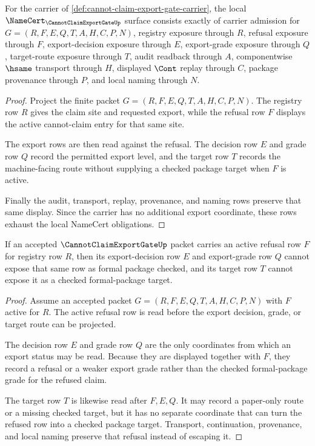 \begin{theorem}
\label{thm:cannot-claim-export-gate-obligations}
For the carrier of \autoref{def:cannot-claim-export-gate-carrier}, the local $\NameCert_{\CannotClaimExportGateUp}$ surface consists exactly of carrier admission for $G=(R,F,E,Q,T,A,H,C,P,N)$, registry exposure through $R$, refusal exposure through $F$, export-decision exposure through $E$, export-grade exposure through $Q$, target-route exposure through $T$, audit readback through $A$, componentwise $\hsame$ transport through $H$, displayed $\Cont$ replay through $C$, package provenance through $P$, and local naming through $N$.
\end{theorem}
\begin{proof}
Project the finite packet $G=(R,F,E,Q,T,A,H,C,P,N)$. The registry row $R$ gives the claim site and requested export, while the refusal row $F$ displays the active cannot-claim entry for that same site.

The export rows are then read against the refusal. The decision row $E$ and grade row $Q$ record the permitted export level, and the target row $T$ records the machine-facing route without supplying a checked package target when $F$ is active.

Finally the audit, transport, replay, provenance, and naming rows preserve that same display. Since the carrier has no additional export coordinate, these rows exhaust the local NameCert obligations.
\end{proof}

\begin{theorem}
\label{thm:cannot-claim-export-gate-refusal-nonescape}
If an accepted $\CannotClaimExportGateUp$ packet carries an active refusal row $F$ for registry row $R$, then its export-decision row $E$ and export-grade row $Q$ cannot expose that same row as formal package checked, and its target row $T$ cannot expose it as a checked formal-package target.
\end{theorem}
\begin{proof}
Assume an accepted packet $G=(R,F,E,Q,T,A,H,C,P,N)$ with $F$ active for $R$. The active refusal row is read before the export decision, grade, or target route can be projected.

The decision row $E$ and grade row $Q$ are the only coordinates from which an export status may be read. Because they are displayed together with $F$, they record a refusal or a weaker export grade rather than the checked formal-package grade for the refused claim.

The target row $T$ is likewise read after $F,E,Q$. It may record a paper-only route or a missing checked target, but it has no separate coordinate that can turn the refused row into a checked package target. Transport, continuation, provenance, and local naming preserve that refusal instead of escaping it.
\end{proof}

